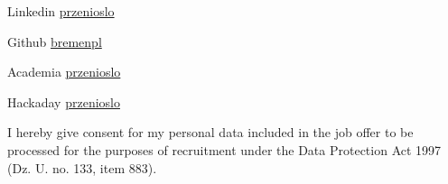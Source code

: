 \documentclass{tccv}
\begin{document}
\begin{factlist}

\item{Linkedin}
     {\href{http://pl.linkedin.com/in/przenioslo}{przenioslo}}
     
\item{Github}
     {\href{http://github.com/bremenpl}{bremenpl}}
     
\item{Academia}
     {\href{https://zut.academia.edu/przenioslo}{przenioslo}}
     
\item{Hackaday}
     {\href{http://hackaday.io/przenioslo}{przenioslo}}  

\end{factlist} 

\vspace*{\fill} %

{\scriptsize I hereby give consent for my personal data included in the job offer to be processed for the purposes of recruitment under the Data Protection Act 1997 (Dz. U. no. 133, item 883).}
\end{document}
